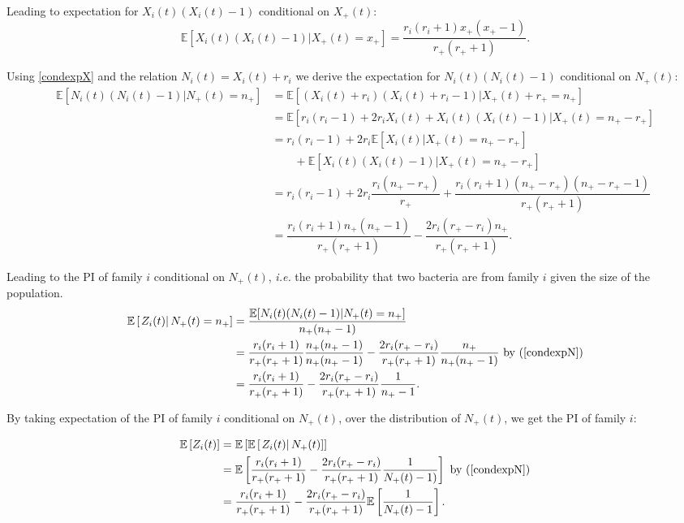 \documentclass{article}
\begin{document}
Leading to expectation for $X_i(t)(X_i(t)-1)$ conditional on $X_+(t)$:
\begin{equation}
 \mathbb{E} [ X_i(t)(X_i(t)-1) \vert X_+(t)=x_+ ] =\dfrac{r_i(r_i+1) x_+ ( x_+ -1 ) }{r_+ (r_+ +1 )}. \label{condexpX}
\end{equation}

Using \eqref{condexpX} and the relation $N_i(t)=X_i(t)+r_i$ we derive the expectation for $N_i(t)(N_i(t)-1)$ conditional on $N_+(t)$:
\begin{align}
 \mathbb{E} [ N_i(t)(N_i(t)-1) \vert N_+(t)=n_+ ] &= \mathbb{E} [ ( X_i(t)+r_i)(X_i(t)+r_i -1) \vert X_+(t)+ r_+ = n_+ ] \\
 &= \mathbb{E} [r_i(r_i-1) + 2r_i X_i(t) + X_i(t)(X_i(t)-1) \vert X_+(t)=n_+ - r_+ ]\\
 &= r_i(r_i-1) + 2 r_i \mathbb{E} [ X_i(t) \vert X_+(t)=n_+ - r_+ ]\\
 & \qquad + \mathbb{E} [X_i(t)(X_i(t)-1) \vert X_+(t)=n_+ - r_+ ]\\
  &= r_i(r_i-1) + 2 r_i \dfrac{r_i (n_+ - r_+)}{r_+ } + \dfrac{r_i(r_i+1) (n_+ - r_+) ( n_+ - r_+ -1 ) }{r_+ (r_+ +1 )}\\
 &=\dfrac{r_i(r_i+1) n_+ ( n_+ -1 ) }{r_+ (r_+ +1)} -\dfrac{2 r_{i} (r_+ - r_i) n_+ }{r_+ (r_+ +1)}. \label{condexpN}
\end{align}

Leading to the PI of family $i$ conditional on $N_+(t)$, \textit{i.e.} the probability that two bacteria are from family $i$ given the size of the population. 
\begin{align}
  \mathbb{E}\left[ \left. Z_i(t)  \right\vert N_+(t)=n_+ \right] &= 
 \dfrac{\mathbb{E}[ N_i(t)(N_i(t)-1) \vert N_+(t)=n_+] }{n_+ (n_+ -1 ) }  \\
 &=\dfrac{r_i(r_i+1)}{r_+ (r_+ +1)} \dfrac{n_+ (n_+ -1 ) }{ n_+ (n_+ -1 ) }- \dfrac{2 r_i (r_+ -r_{i})}{r_+ (r_+ +1)} \dfrac{n_+}{ n_+ (n_+ -1 ) } \text{ by }(\eqref{condexpN})\\
 &=\dfrac{r_i(r_i+1)}{r_+ (r_+ +1)}- \dfrac{2 r_i (r_+ -r_{i})}{r_+ (r_+ +1)} \dfrac{1}{ n_+ -1  }. \label{RelatednesscondexpN}
\end{align}

By taking expectation of the PI of family $i$ conditional on $N_+(t)$, over the distribution of $N_+(t)$, we get the PI of family $i$:

\begin{align}
\mathbb{E}\left[ Z_i(t) \right] &= 
 \mathbb{E}\left[ \mathbb{E}\left[ \left. Z_i(t) \right\vert N_+(t) \right] \right]\\
 &=\mathbb{E}\left[\dfrac{r_i(r_i+1)}{r_+ (r_+ +1)}- \dfrac{2 r_i (r_+ -r_{i})}{r_+ (r_+ +1)} \dfrac{1}{N_+(t)-1) } \right] \text{ by }(\eqref{condexpN})\\
 &=\dfrac{r_i(r_i+1)}{r_+ (r_+ +1 )}-\dfrac{2 r_i (r_+ -r_{i})}{r_+ (r_+ +1 )}\mathbb{E}\left[\dfrac{1}{N_+(t)-1} \right].
\end{align}
\end{document}
